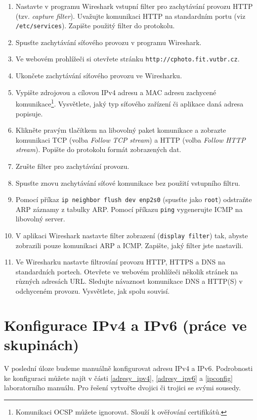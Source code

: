 \documentclass[a4paper,11pt]{article}
\begin{document}
\begin{enumerate}
  \item Nastavte v programu Wireshark vstupní filter pro zachytávání provozu HTTP (tzv. {\em capture filter}). Uvažujte komunikaci HTTP na standardním portu (viz {\tt /etc/services}). Zapište použitý filter do protokolu.
  \item Spusťte zachytávání síťového provozu v programu Wireshark.
  \item Ve webovém prohlížeči si otevřete stránku \texttt{http://cphoto.fit.vutbr.cz}.
  \item Ukončete zachytávání síťového provozu ve Wiresharku. 
  \item Vypište zdrojovou a cílovou IPv4 adresu a MAC adresu zachycené komunikace\footnote{Komunikaci OCSP můžete ignorovat. Slouží k ověřování certifikátů.}. Vysvětlete, jaký typ síťového zařízení či aplikace daná adresa popisuje.
  \item Klikněte pravým tlačítkem na libovolný paket komunikace a zobrazte komunikaci TCP (volba {\em Follow TCP stream}) a HTTP (volba {\em Follow HTTP stream}). Popište do protokolu formát zobrazených dat. 
  \item Zrušte filter pro zachytávání provozu.
  \item Spusťte znovu zachytávání síťové komunikace bez použití vstupního filtru.
  \item Pomocí příkaz \texttt{ip neighbor flush dev enp2s0} (spusťte jako {\tt root}) odstraňte ARP záznamy z tabulky ARP. Pomocí příkazu {\tt ping} vygenerujte ICMP na libovolný server.
  \item V aplikaci Wireshark nastavte filter zobrazení ({\tt display filter}) tak, abyste zobrazili pouze komunikaci ARP a ICMP. Zapište, jaký filter jste nastavili.
  \item Ve Wiresharku nastavte filtrování provozu HTTP, HTTPS a DNS na standardních portech. Otevřete ve webovém prohlížeči několik stránek na různých adresách URL. Sledujte návaznost komunikace DNS a HTTP(S) v odchyceném provozu. Vysvětlete, jak spolu souvisí. 
\end{enumerate}

\section{Konfigurace IPv4 a IPv6 (práce ve skupinách)}
V poslední úloze budeme manuálně konfigurovat adresu IPv4 a IPv6. Podrobnosti ke konfiguraci můžete najít v části \ref{adresy_ipv4}, \ref{adresy_ipv6} a \ref{ipconfig} laboratorního manuálu. Pro řešení vytvořte dvojici či trojici se svými sousedy.
\end{document}
